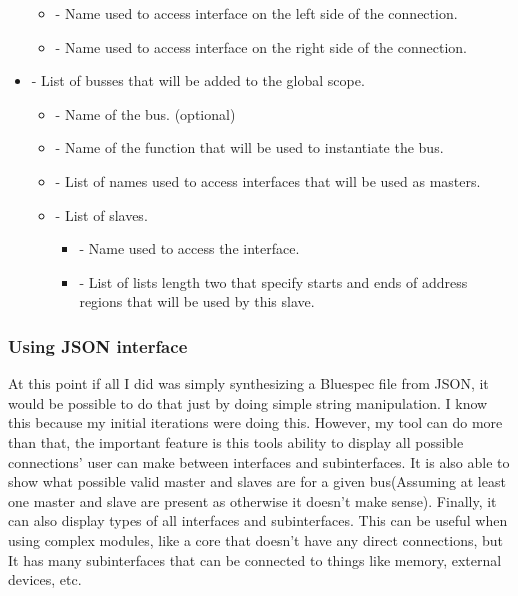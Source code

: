\documentclass[14pt]{report}
\begin{document}
\begin{itemize}
\begin{itemize}
        \item {} - Name used to access interface on the left side of the connection.
        \item {} - Name used to access interface on the right side of the connection.
    \end{itemize}
    \item  {} - List of busses that will be added to the global scope. \\
    \begin{itemize}
        \item {} - Name of the bus. (optional)
        \item {} - Name of the function that will be used to instantiate the bus.
        \item {} - List of names used to access interfaces that will be used as masters.
        \item {} - List of slaves. \\
        \begin{itemize}
            \item {} - Name used to access the interface.
            \item {} - List of lists length two that specify starts and ends of address regions that will be used by this slave. \\
        \end{itemize}
    \end{itemize}
\end{itemize}

\subsubsection*{Using JSON interface}
At this point if all I did was simply synthesizing a Bluespec file from JSON, it would be possible to do that just by doing simple string manipulation. I know this because my initial iterations were doing this. However, my tool can do more than that, the important feature is this tools ability to display all possible connections' user can make between interfaces and subinterfaces. It is also able to show what possible valid master and slaves are for a given bus(Assuming at least one master and slave are present as otherwise it doesn't make sense). Finally, it can also display types of all interfaces and subinterfaces. This can be useful when using complex modules, like a core that doesn't have any direct connections, but It has many subinterfaces that can be connected to things like memory, external devices, etc. \\
\end{document}
